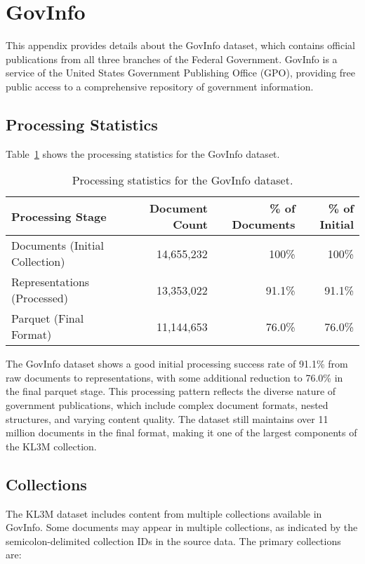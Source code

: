 \section{GovInfo}
\label{appendix:govinfo}

This appendix provides details about the GovInfo dataset, which contains official publications from all three branches of the Federal Government. GovInfo is a service of the United States Government Publishing Office (GPO), providing free public access to a comprehensive repository of government information.

\subsection{Processing Statistics}

Table~\ref{table:govinfo-stats} shows the processing statistics for the GovInfo dataset.

\begin{table}[h]
\centering
\begin{tabular}{|l|r|r|r|}
\hline
\textbf{Processing Stage} & \textbf{Document Count} & \textbf{\% of Documents} & \textbf{\% of Initial} \\
\hline
Documents (Initial Collection) & 14,655,232 & 100\% & 100\% \\
Representations (Processed) & 13,353,022 & 91.1\% & 91.1\% \\
Parquet (Final Format) & 11,144,653 & 76.0\% & 76.0\% \\
\hline
\end{tabular}
\caption{Processing statistics for the GovInfo dataset.}
\label{table:govinfo-stats}
\end{table}

The GovInfo dataset shows a good initial processing success rate of 91.1\% from raw documents to representations, with some additional reduction to 76.0\% in the final parquet stage. This processing pattern reflects the diverse nature of government publications, which include complex document formats, nested structures, and varying content quality. The dataset still maintains over 11 million documents in the final format, making it one of the largest components of the KL3M collection.

\subsection{Collections}

The KL3M dataset includes content from multiple collections available in GovInfo. Some documents may appear in multiple collections, as indicated by the semicolon-delimited collection IDs in the source data. The primary collections are:

